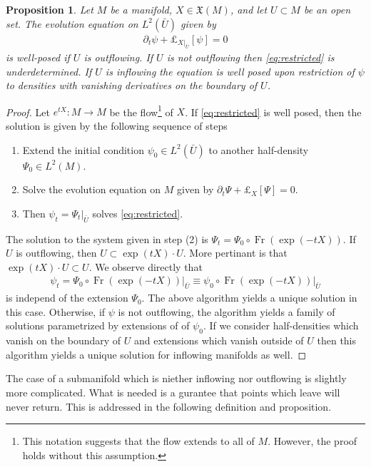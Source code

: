 \documentclass[12pt]{amsart}
\newtheorem{prop}{Proposition}
\DeclareMathOperator{\Fr}{Fr}
\begin{document}
\begin{prop}
  Let $M$ be a manifold, $X \in \mathfrak{X}(M)$, and let $U \subset M$ be an open set.  The evolution equation on $L^2(\bar{U})$ given by
  \begin{align}
    \partial_t \psi + \pounds_{X|_{\bar{U}}}[\psi] = 0 \label{eq:restricted}
  \end{align}
  is well-posed if $U$ is outflowing.
  If $U$ is not outflowing then \eqref{eq:restricted} is underdetermined.
  If $U$ is inflowing the equation is well posed upon restriction of $\psi$ to densities with vanishing derivatives on the boundary of $U$.
\end{prop}
\begin{proof}
  Let $e^{tX}:M \to M$ be the flow\footnote{This notation suggests that the flow extends to all of $M$. However, the proof holds without this assumption.} of $X$.
  If \eqref{eq:restricted} is well posed, then the solution is given by the following sequence of steps
  \begin{enumerate}
    \item Extend the initial condition $\psi_0 \in L^2( \bar{U})$ to another half-density $\Psi_0 \in L^2(M)$.
    \item Solve the evolution equation on $M$ given by $\partial_t \Psi + \pounds_X[\Psi] = 0$.
    \item Then $\psi_t = \Psi_t |_{\bar{U}}$ solves \eqref{eq:restricted}.
  \end{enumerate}
  The solution to the system given in step (2) is $\Psi_t = \Psi_0 \circ \Fr( \exp( -tX) )$.
  If $U$ is outflowing, then $U \subset \exp(tX) \cdot U$.
  More pertinant is that $\exp(tX) \cdot U \subset U$.
  We observe directly that
  \begin{align*}
    \psi_t = \left. \Psi_0 \circ \Fr( \exp( -tX) ) \right|_{\bar{U}}
    \equiv \psi_0 \circ \Fr( \exp(-tX) ) |_{\bar{U}}
  \end{align*}
  is independ of the extension $\Psi_0$.
  The above algorithm yields a unique solution in this case.
  Otherwise, if $\psi$ is not outflowing, the algorithm yields a
  family of solutions parametrized by extensions of of $\psi_0$.
  If we consider half-densities which vanish on the boundary of $U$ and extensions which vanish outside of $U$ then this algorithm yields a unique solution for inflowing manifolds as well.
\end{proof}

The case of a submanifold which is niether inflowing nor outflowing is slightly more complicated.  What is needed is a gurantee that points which leave will never return.  This is addressed in the following definition and proposition.
\end{document}
